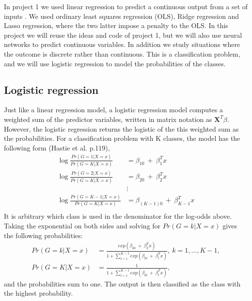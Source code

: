 In project 1 we used linear regression to predict a continuous output from a set of inputs \cite{project1-eirik-joakim,project1-vege}. We used ordinary least squares regression (OLS), Ridge regression and Lasso regression, where the two latter impose a penalty to the OLS. In this project we will reuse the ideas and code of project 1, but we will also use neural networks to predict continuous variables. In addition we study situations where the outcome is discrete rather than continuous. This is a classification problem, and we will use logistic regression to model the probabilities of the classes.\\

\subsection{Logistic regression}
Just like a linear regression model, a logistic regression model computes a weighted sum of the predictor variables, written in matrix notation as $\bm{X}^T\beta$. However, the logistic regression returns the logistic of the this weighted sum as the probabilities. For a classification problem with K classes, the model has the following form (Hastie et al. p.119), \\
\begin{equation}\label{eqT:logreg_def}
\begin{split}
\log\frac{Pr(G=1|X=x)}{Pr(G=K|X=x)} &= \beta_{10}\ +\ \beta_{1}^Tx\\
\log\frac{Pr(G=2|X=x)}{Pr(G=K|X=x)} &= \beta_{20}\ +\ \beta_{2}^Tx\\
&\vdots\\
\log\frac{Pr(G=K-1|X=x)}{Pr(G=K|X=x)} &= \beta_{(K-1)0}\ +\ \beta_{K-1}^Tx\\
\end{split}
\end{equation}
It is arbitrary which class is used in the denominator for the log-odds above. Taking the exponential on both sides and solving for $Pr(G=k|X=x)$ gives the following probabilities:\\
\begin{equation}\label{eqT:logreg_prob}
\begin{split}
Pr(G=k|X=x) &= \frac{exp(\beta_{k0}\ +\ \beta_{k}^Tx)}{1+\sum_{l=1}^{K-1}exp(\beta_{l0}\ +\ \beta_{l}^Tx)},\ k=1,\dots,K-1,\\
Pr(G=K|X=x) &= \frac{1}{1+\sum_{l=1}^{K-1}exp(\beta_{l0}\ +\ \beta_{l}^Tx)},
\end{split}
\end{equation}
and the probabilities sum to one. The output is then classified as the class with the highest probability.\\

